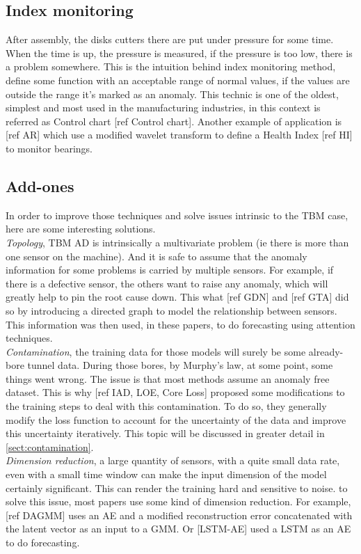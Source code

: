 \documentclass[../../main/main.tex]{subfiles}
\begin{document}
    \subsection{Index monitoring}\label{subsec:indexing}
        After assembly, the disks cutters there are put under pressure for some time. When the time is up, the 
        pressure is measured, if the pressure is too low, there is a problem somewhere. This is the intuition behind index 
        monitoring method, define some function with an acceptable range of normal values, if the values are outside the range 
        it's marked as an anomaly. This technic is one of the oldest, simplest and most used in the manufacturing industries, in
        this context is referred as Control chart [ref Control chart]. Another example of application is [ref AR] which 
        use a modified wavelet transform to define a Health Index [ref HI] to monitor bearings. 
    
    \subsection{Add-ones}\label{subsec:add_ons}
        In order to improve those techniques and solve issues intrinsic to the TBM case, here are some interesting solutions.\\
        \textit{Topology}, TBM AD is intrinsically a multivariate problem (ie there is more than one sensor on the machine).
        And it is safe to assume that the anomaly information for some problems is carried by multiple sensors. For example, if there 
        is a defective sensor, the others want to raise any anomaly, which will greatly help to pin the root cause down. This what 
        [ref GDN] and [ref GTA] did so by introducing a directed graph to model the relationship between sensors. This information 
        was then used, in these papers, to do forecasting using attention techniques.\\
        
        \textit{Contamination}, the training data for those models will surely be some already-bore tunnel data. 
        During those bores, by Murphy's law, at some point, some things went wrong. The issue is that most methods assume an anomaly
        free dataset. This is why [ref IAD, LOE, Core Loss] proposed some modifications to the training steps to deal with this 
        contamination. To do so, they generally modify the loss function to account for the uncertainty of the data and improve 
        this uncertainty iteratively. This topic will be discussed in greater detail in \ref{sect:contamination}.\\
    
        \textit{Dimension reduction}, a large quantity of sensors, with a quite small data rate, even with a small time window
        can make the input dimension of the model certainly significant. This can render the training hard and sensitive to noise. 
        to solve this issue, most papers use some kind of dimension reduction. For example, [ref DAGMM] uses an AE and 
        a modified reconstruction error concatenated with the latent vector as an input to a GMM. Or [LSTM-AE] used a \ac{LSTM} as
        an AE to do forecasting.

        
    
\end{document}
